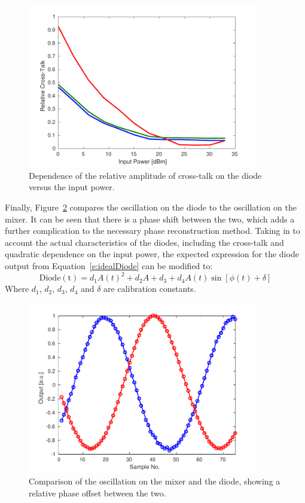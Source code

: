 \begin{figure}
  \centering
  \includegraphics[width=0.9\textwidth]{Figures/phaseMons/RelativeDiodeXTalkVsPower}
  \caption{Dependence of the relative amplitude of cross-talk on the diode versus the input power.}
  \label{f:RelativeDiodeXTalkVsPower}
\end{figure}

Finally, Figure~\ref{f:PhaseDiodeVsMixer} compares the oscillation on the diode to the oscillation on the mixer. It can be seen that there is a phase shift between the two, which adds a further complication to the necessary phase reconstruction method. Taking in to account the actual characteristics of the diodes, including the cross-talk and quadratic dependence on the input power, the expected expression for the diode output from Equation~\ref{e:idealDiode} can be modified to:
\begin{equation}
\mathrm{Diode(t)} = d_1A(t)^2 + d_2A + d_3 + d_4A(t)\sin[\phi(t)+\delta]
\label{e:actualDiodeResponse}
\end{equation}
Where \(d_1\), \(d_2\), \(d_3\), \(d_4\) and \(\delta\) are calibration constants.

\begin{figure}
  \centering
  \includegraphics[width=0.9\textwidth]{Figures/phaseMons/PhaseDiodeVsMixer}
  \caption{Comparison of the oscillation on the mixer and the diode, showing a relative phase offset between the two.}
  \label{f:PhaseDiodeVsMixer}
\end{figure}

